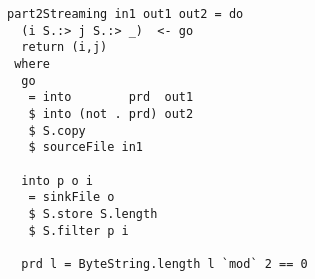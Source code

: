 \begin{lstlisting}[float,label=l:a:bench:part2Streaming,caption=Streaming implementation of \Hs/part2/]
part2Streaming in1 out1 out2 = do
  (i S.:> j S.:> _)  <- go
  return (i,j)
 where
  go
   = into        prd  out1
   $ into (not . prd) out2
   $ S.copy
   $ sourceFile in1

  into p o i
   = sinkFile o
   $ S.store S.length
   $ S.filter p i

  prd l = ByteString.length l `mod` 2 == 0
\end{lstlisting}

% 
% 


